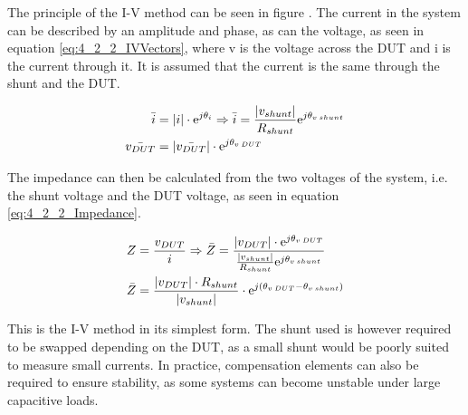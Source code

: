 The principle of the I-V method can be seen in figure . The current in the system can be described by an amplitude and phase, as can the voltage, as seen in equation \ref{eq:4_2_2_IVVectors}, where v is the voltage across the DUT and i is the current through it. It is assumed that the current is the same through the shunt and the DUT.

\begin{equation}
    \label{eq:4_2_2_IVVectors}
    \begin{split}
        \bar{i} & = |i|\cdot\mathrm{e} ^{j\theta_i} \Rightarrow \bar{i} = \frac{|v_{shunt}|}{R_{shunt}}\mathrm{e} ^{j\theta_{v\:shunt}}\\
        \bar{v_{DUT}} & = |\bar{v_{DUT}}| \cdot\mathrm{e} ^{j\theta_{v\:DUT}}
    \end{split}
\end{equation}

The impedance can then be calculated from the two voltages of the system, i.e. the shunt voltage and the DUT voltage, as seen in equation \ref{eq:4_2_2_Impedance}.

\begin{equation}
    \label{eq:4_2_2_Impedance}
    \begin{split}
        Z & = \frac{v_{DUT}}{i} \Rightarrow \bar{Z} = \frac{|v_{DUT}| \cdot\mathrm{e} ^{j\theta_{v\:DUT}}}{\frac{|v_{shunt}|}{R_{shunt}}\mathrm{e} ^{j\theta_{v\:shunt}}} \\
        \bar{Z} & = \frac{|v_{DUT}|\cdot R_{shunt}}{|v_{shunt}|}\cdot \mathrm{e} ^{j\left(\theta_{v\:DUT}-\theta_{v\:shunt}\right)}
    \end{split}
\end{equation}

This is the I-V method in its simplest form. The shunt used is however required to be swapped depending on the DUT, as a small shunt would be poorly suited to measure small currents. In practice, compensation elements can also be required to ensure stability, as some systems can become unstable under large capacitive loads.